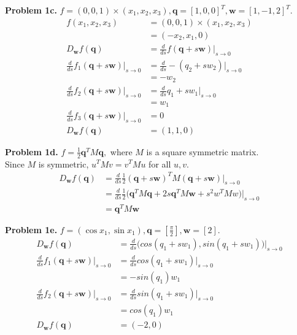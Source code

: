 \documentclass[11pt]{article}
\newcommand{\bq}{\mathbf{q}}
\newcommand{\bw}{\mathbf{w}}
\begin{document}
\noindent \textbf{Problem 1c.}
$f = (0,0,1) \times (x_1, x_2, x_3), \bq = [1,0,0]^T, \bw = [1,-1,2]^T.$
\begin{align*}
f(x_1, x_2, x_3) 
    &= (0, 0, 1) \times (x_1, x_2, x_3) \\
    &= (- x_2, x_1, 0) \\
D_\bw f(\bq)
    &= \frac{d}{ds} f(\bq + s \bw) \big|_{s \to 0} \\
\frac{d}{ds} f_1 (\bq + s \bw) \big|_{s \to 0}
    &= \frac{d}{ds} -(q_2 + s w_2) \big|_{s \to 0} \\
    &= -w_2 \\
\frac{d}{ds} f_2 (\bq + s \bw) \big|_{s \to 0}
    &= \frac{d}{ds} q_1 + s w_1 \big|_{s \to 0} \\
    &= w_1 \\
\frac{d}{ds} f_3 (\bq + s \bw) \big|_{s \to 0}
    &= 0 \\
D_\bw f(\bq)
    &= (1, 1, 0)
\end{align*}

\noindent \textbf{Problem 1d.}
$f = \frac{1}{2}\bq^TM\bq,$ where $M$ is a square symmetric matrix. \\

\noindent Since $M$ is symmetric, $u^T M v = v^T M u$ for all $u, v$.
\begin{align*}
D_\bw f(\bq)
    &= \frac{d}{ds} \frac{1}{2} (\bq + s \bw)^T M (\bq + s \bw) \Big|_{s \to 0} \\
    &= \frac{d}{ds} \frac{1}{2} \big(\bq^T M \bq + 2 s \bq^T M \bw + s^2 w^T M w \big) \Big|_{s \to 0} \\
    &= \bq^T M \bw
\end{align*}

\noindent \textbf{Problem 1e.}
$f = (\cos x_1, \sin x_1), \bq = [\frac{\pi}{2}], \bw = [2].$
\begin{align*}
D_\bw f(\bq)
    &= \frac{d}{ds} \big(cos(q_1 + s w_1), sin(q_1 + s w_1)\big) \Big|_{s \to 0} \\
\frac{d}{ds} f_1(\bq + s \bw) \Big|_{s \to 0}
    &= \frac{d}{ds} cos(q_1 + s w_1) \Big|_{s \to 0} \\
    &= -sin(q_1) w_1 \\
\frac{d}{ds} f_2(\bq + s \bw) \Big|_{s \to 0}
    &= \frac{d}{ds} sin(q_1 + s w_1) \Big|_{s \to 0} \\
    &= cos(q_1) w_1 \\
D_\bw f(\bq)
    &= (-2, 0) \\
\end{align*}
\end{document}
